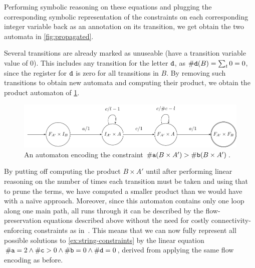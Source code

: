Performing symbolic reasoning on these equations and plugging the corresponding
symbolic representation of the constraints on each corresponding integer
variable back as an annotation on its transition, we get obtain the two automata
in \cref{fig:propagated}.

Several transitions are already marked as unuseable (have a transition variable
value of $0$). This includes any transition for the letter $\texttt{d}$, as
$\#\text{\texttt{d}}(B) = \sum_{t} 0 = 0$, since the register for
$\texttt{d}$ is zero for all transitions in $B$. By removing such transitions to
obtain new automata and computing their product, we obtain the product automaton
of \cref{fig:product}.

\begin{figure}[h]
    \centering 
    \includegraphics[scale=\autscale]{ab}
  \caption{An automaton encoding the constraint $\#\text{\texttt{a}}(B \times A')
  > \#\text{\texttt{b}}(B \times A')$.}\label{fig:product}
\end{figure}

By putting off computing the product $B \times A'$ until after performing linear
reasoning on the number of times each transition must be taken and using that to
prune the terms, we have computed a smaller product than we would have with a
na\"ive approach. Moreover, since this automaton contains only one loop along
one main path, all runs through it can be described by the flow-preservation
equations described above without the need for costly connectivity-enforcing
constraints as in~\cite{generate-parikh-image}. This means that we can now fully
represent all possible solutions to \cref{ex:string-constraints} by the linear
equation $\#\text{\texttt{a}} = 2 \land \#\text{\texttt{c}} > 0 \land
\#\text{\texttt{b}} = 0 \land \#\text{\texttt{d}} = 0$, derived from applying the
same flow encoding as before.
